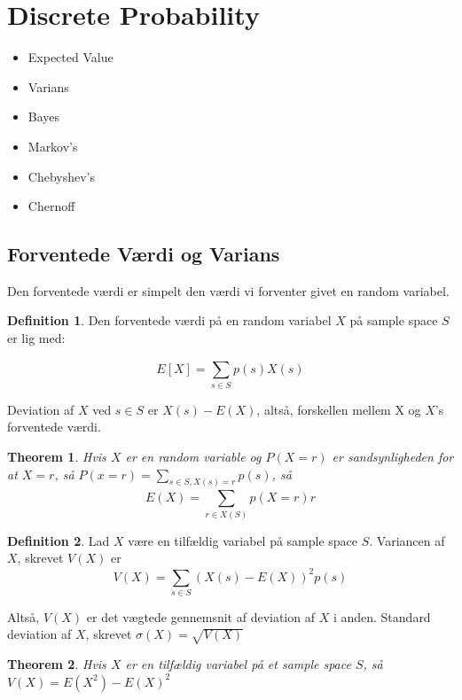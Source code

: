 \documentclass[11pt]{article}
\newtheorem{theorem}{Theorem}
\theoremstyle{definition}
\newtheorem{definition}{Definition}
\theoremstyle{remark}
\begin{document}
\newpage


\section{Discrete Probability}
\label{sec:discprob}


\begin{itemize}
\item Expected Value
\item Varians
\item Bayes
\item Markov's
\item Chebyshev's
\item Chernoff
\end{itemize}

\subsection{Forventede Værdi og Varians}
\label{subsec:label}

Den forventede værdi er simpelt den værdi vi forventer givet en random variabel. 

\begin{definition}
  Den forventede værdi på en random variabel $X$ på sample space $S$ er lig med:

  \[
E[X] = \sum_{s \in S}^{}p(s) X(s)
  \]

  Deviation af $X$ ved $s \in S$ er $X(s) - E(X)$, altså, forskellen mellem X og $X$'s forventede værdi.
  
\end{definition}

\begin{theorem}
  Hvis $X$ er en random variable og $P(X=r)$ er sandsynligheden for at $X =r$, så $P(x=r) = \sum_{s \in S, X(s)=r}^{}p(s)$, så
  \[
    E(X) = \sum_{r \in X(S)}^{} p(X = r)r
  \]
\end{theorem}

\begin{definition}
  Lad $X$ være en tilfældig variabel på sample space $S$. Variancen af $X$, skrevet $V(X)$ er
  \[
V(X) = \sum_{s \in S}^{} (X(s) - E(X))^{2}p(s)
  \]

  Altså, $V(X)$ er det vægtede gennemsnit af deviation af $X$ i anden. Standard deviation af $X$, skrevet $\sigma(X) = \sqrt{V(X)}$
\end{definition}

\begin{theorem}
Hvis $X$ er en tilfældig variabel på et sample space $S$, så $V(X) = E(X^{2}) - E(X)^{2}$
\end{theorem}
\end{document}
